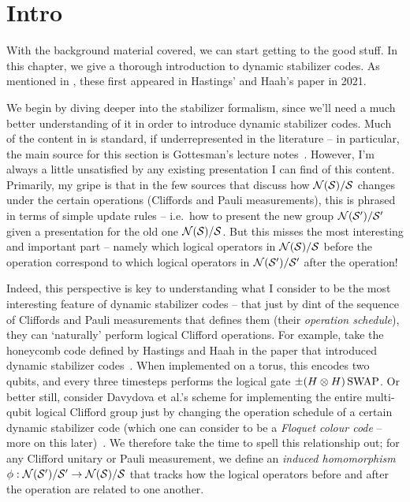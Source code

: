 \section{Intro}

With the background material covered, we can start getting to the good stuff.
In this chapter, we give a thorough introduction to dynamic stabilizer codes.
As mentioned in , these first appeared in Hastings' and Haah's paper  in 2021.

We begin by diving deeper into the stabilizer formalism, since we'll need a much better understanding of it in order to introduce dynamic stabilizer codes.
Much of the content in  is standard, if underrepresented in the literature -- in particular, the main source for this section is Gottesman's lecture notes~\cite{gottesman2024surviving}.
However, I'm always a little unsatisfied by any existing presentation I can find of this content.
Primarily, my gripe is that in the few sources that discuss how $\mathcal{N}(\mathcal{S})/\mathcal{S}$ changes under the certain operations (Cliffords and Pauli measurements), this is phrased in terms of simple update rules -- i.e.\ how to present the new group $\mathcal{N}(\mathcal{S}')/\mathcal{S}'$ given a presentation for the old one $\mathcal{N}(\mathcal{S})/\mathcal{S}$.
But this misses the most interesting and important part -- namely which logical operators in $\mathcal{N}(\mathcal{S})/\mathcal{S}$ before the operation correspond to which logical operators in $\mathcal{N}(\mathcal{S}')/\mathcal{S}'$ after the operation!

Indeed, this perspective is key to understanding what I consider to be the most interesting feature of dynamic stabilizer codes -- that just by dint of the sequence of Cliffords and Pauli measurements that defines them (their \textit{operation schedule}), they can `naturally' perform logical Clifford operations.
For example, take the honeycomb code defined by Hastings and Haah in the paper that introduced dynamic stabilizer codes~\cite{Hastings_2021}.
When implemented on a torus, this encodes two qubits, and every three timesteps performs the logical gate $\pm (H \otimes H) \operatorname{SWAP}$.
Or better still, consider Davydova et al.'s scheme for implementing the entire multi-qubit logical Clifford group just by changing the operation schedule of a certain dynamic stabilizer code (which one can consider to be a \textit{Floquet colour code} -- more on this later)~\cite{Davydova_2024}.
We therefore take the time to spell this relationship out; for any Clifford unitary or Pauli measurement, we define an \textit{induced homomorphism} $\phi: \mathcal{N}(\mathcal{S}')/\mathcal{S}' \to \mathcal{N}(\mathcal{S})/\mathcal{S}$ that tracks how the logical operators before and after the operation are related to one another.

